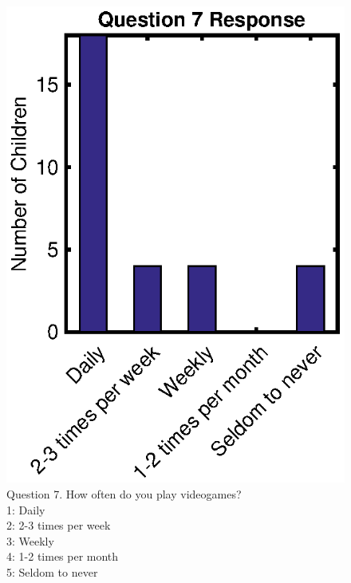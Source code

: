 	\begin{figure}
		\centering
		\includegraphics{figures/gamepaper/Question7}
		\caption[Feedback Videogame Survey Question 7]{Question 7. How often do you play videogames? \\ 1: Daily\\ 2: 2-3 times per week\\ 3: Weekly\\ 4: 1-2 times per month\\ 5: Seldom to never}
		\label{fig:question7}
	\end{figure}

\newpage %
